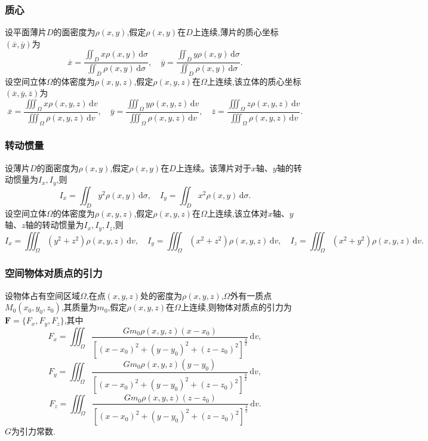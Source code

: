 \documentclass[UTF8]{ctexart}
\theoremstyle{remark}
\begin{document}
	\subsubsection{质心}
	设平面薄片\(D\)的面密度为\(\rho(x,y)\),假定\(\rho(x,y)\)在\(D\)上连续,薄片的质心坐标\((\overline{x},\overline{y})\)为
	\[
	\overline{x} = \frac{\iint_{D} x\rho(x,y) \, \mathrm{d}\sigma}{\iint_{D} \rho(x,y) \, \mathrm{d}\sigma}, \quad
	\overline{y} = \frac{\iint_{D} y\rho(x,y) \, \mathrm{d}\sigma}{\iint_{D} \rho(x,y) \, \mathrm{d}\sigma}.
	\]
	设空间立体\(\Omega\)的体密度为\(\rho(x,y,z)\),假定\(\rho(x,y,z)\)在\(\Omega\)上连续,该立体的质心坐标\((\overline{x},\overline{y},\overline{z})\)为
	\[
	\overline{x} = \frac{\iiint_{\Omega} x\rho(x,y,z) \, \mathrm{d}v}{\iiint_{\Omega} \rho(x,y,z) \, \mathrm{d}v}, \quad
	\overline{y} = \frac{\iiint_{\Omega} y\rho(x,y,z) \, \mathrm{d}v}{\iiint_{\Omega} \rho(x,y,z) \, \mathrm{d}v}, \quad
	\overline{z} = \frac{\iiint_{\Omega} z\rho(x,y,z) \, \mathrm{d}v}{\iiint_{\Omega} \rho(x,y,z) \, \mathrm{d}v}.
	\]
	
	\subsubsection{转动惯量}
	设薄片\(D\)的面密度为\(\rho(x,y)\),假定\(\rho(x,y)\)在\(D\)上连续。该薄片对于\(x\)轴、\(y\)轴的转动惯量为\(I_x, I_y\),则
	\[
	I_x = \iint_{D} y^2\rho(x,y) \, \mathrm{d}\sigma, \quad
	I_y = \iint_{D} x^2\rho(x,y) \, \mathrm{d}\sigma.
	\]
	设空间立体\(\Omega\)的体密度为\(\rho(x,y,z)\),假定\(\rho(x,y,z)\)在\(\Omega\)上连续,该立体对\(x\)轴、\(y\)轴、\(z\)轴的转动惯量为\(I_x, I_y, I_z\),则
	\[
	I_x = \iiint_{\Omega} (y^2 + z^2)\rho(x,y,z) \, \mathrm{d}v, \quad
	I_y = \iiint_{\Omega} (x^2 + z^2)\rho(x,y,z) \, \mathrm{d}v, \quad
	I_z = \iiint_{\Omega} (x^2 + y^2)\rho(x,y,z) \, \mathrm{d}v.
	\]
	
	\subsubsection{空间物体对质点的引力}
	设物体占有空间区域\(\Omega\),在点\((x,y,z)\)处的密度为\(\rho(x,y,z)\),\(\Omega\)外有一质点\(M_0(x_0,y_0,z_0)\),其质量为\(m_0\),假定\(\rho(x,y,z)\)在\(\Omega\)上连续,则物体对质点的引力为\(\boldsymbol{F}=\{F_x,F_y,F_z\}\),其中
	\[
	F_x = \iiint_{\Omega} \frac{Gm_0\rho(x,y,z)(x - x_0)}{\left[(x - x_0)^2 + (y - y_0)^2 + (z - z_0)^2\right]^{\frac{3}{2}}} \, \mathrm{d}v,
	\]
	\[
	F_y = \iiint_{\Omega} \frac{Gm_0\rho(x,y,z)(y - y_0)}{\left[(x - x_0)^2 + (y - y_0)^2 + (z - z_0)^2\right]^{\frac{3}{2}}} \, \mathrm{d}v,
	\]
	\[
	F_z = \iiint_{\Omega} \frac{Gm_0\rho(x,y,z)(z - z_0)}{\left[(x - x_0)^2 + (y - y_0)^2 + (z - z_0)^2\right]^{\frac{3}{2}}} \, \mathrm{d}v.
	\]
	\(G\)为引力常数.
	
\end{document}
